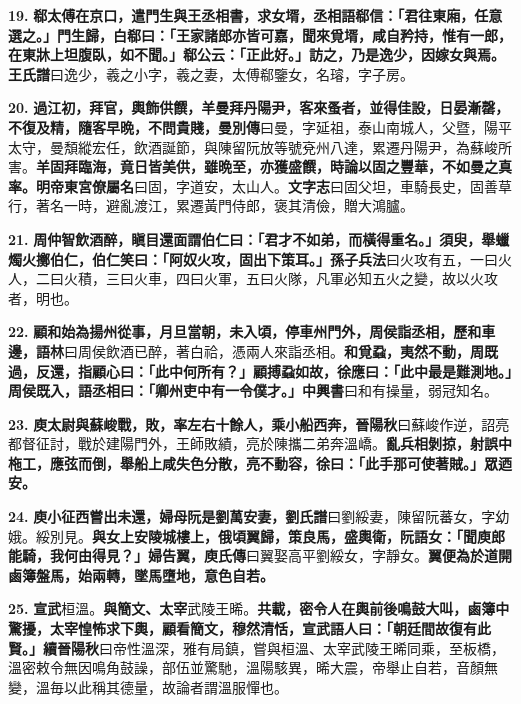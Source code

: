 \textbf{19.} \textbf{郗太傅在京口，遣門生與王丞相書，求女壻，丞相語郗信：「君往東廂，任意選之。」門生歸，白郗曰：「王家諸郎亦皆可嘉，聞來覓壻，咸自矜持，惟有一郎，在東牀上坦腹臥，如不聞。」郗公云：「正此好。」訪之，乃是逸少，因嫁女與焉。}{\footnotesize \textbf{王氏譜}曰逸少，羲之小字，羲之妻，太傅郗鑒女，名璿，字子房。}

\textbf{20.} \textbf{過江初，拜官，輿飾供饌，羊曼拜丹陽尹，客來蚤者，並得佳設，日晏漸罄，不復及精，隨客早晩，不問貴賤，}{\footnotesize \textbf{曼別傳}曰曼，字延祖，泰山南城人，父暨，陽平太守，曼頽縱宏任，飲酒誕節，與陳留阮放等號兗州八達，累遷丹陽尹，為蘇峻所害。}\textbf{羊固拜臨海，竟日皆美供，雖晩至，亦獲盛饌，時論以固之豐華，不如曼之真率。}{\footnotesize \textbf{明帝東宮僚屬名}曰固，字道安，太山人。\textbf{文字志}曰固父坦，車騎長史，固善草行，著名一時，避亂渡江，累遷黃門侍郎，褒其清儉，贈大鴻臚。}

\textbf{21.} \textbf{周仲智飲酒醉，瞋目還面謂伯仁曰：「君才不如弟，而橫得重名。」須臾，舉蠟燭火擲伯仁，伯仁笑曰：「阿奴火攻，固出下策耳。」}{\footnotesize \textbf{孫子兵法}曰火攻有五，一曰火人，二曰火積，三曰火車，四曰火軍，五曰火隊，凡軍必知五火之變，故以火攻者，明也。}

\textbf{22.} \textbf{顧和始為揚州從事，月旦當朝，未入頃，停車州門外，周侯詣丞相，歷和車邊，}{\footnotesize \textbf{語林}曰周侯飲酒已醉，著白祫，憑兩人來詣丞相。}\textbf{和覓蝨，夷然不動，周既過，反還，指顧心曰：「此中何所有？」顧搏蝨如故，徐應曰：「此中最是難測地。」周侯既入，語丞相曰：「卿州吏中有一令僕才。」}{\footnotesize \textbf{中興書}曰和有操量，弱冠知名。}

\textbf{23.} \textbf{庾太尉與蘇峻戰，敗，率左右十餘人，乘小船西奔，}{\footnotesize \textbf{晉陽秋}曰蘇峻作逆，詔亮都督征討，戰於建陽門外，王師敗績，亮於陳攜二弟奔溫嶠。}\textbf{亂兵相剝掠，射誤中柂工，應弦而倒，舉船上咸失色分散，亮不動容，徐曰：「此手那可使著賊。」眾迺安。}

\textbf{24.} \textbf{庾小征西嘗出未還，婦母阮是劉萬安妻，}{\footnotesize \textbf{劉氏譜}曰劉綏妻，陳留阮蕃女，字幼娥。綏別見。}\textbf{與女上安陵城樓上，俄頃翼歸，策良馬，盛輿衛，阮語女：「聞庾郎能騎，我何由得見？」婦告翼，}{\footnotesize \textbf{庾氏傳}曰翼娶高平劉綏女，字靜女。}\textbf{翼便為於道開鹵簿盤馬，始兩轉，墜馬墮地，意色自若。}

\textbf{25.} \textbf{宣武}{\footnotesize 桓溫。}\textbf{與簡文、太宰}{\footnotesize 武陵王晞。}\textbf{共載，密令人在輿前後鳴鼓大叫，鹵簿中驚擾，太宰惶怖求下輿，顧看簡文，穆然清恬，宣武語人曰：「朝廷間故復有此賢。」}{\footnotesize \textbf{續晉陽秋}曰帝性溫深，雅有局鎮，嘗與桓溫、太宰武陵王晞同乘，至板橋，溫密敕令無因鳴角鼓譟，部伍並驚馳，溫陽駭異，晞大震，帝舉止自若，音顏無變，溫毎以此稱其德量，故論者謂溫服憚也。}

